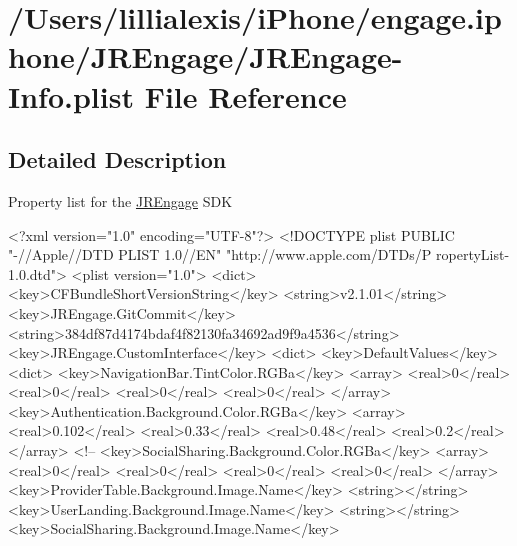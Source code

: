 \hypertarget{_j_r_engage-_info_8plist}{
\section{/Users/lillialexis/iPhone/engage.iphone/JREngage/JREngage-\/Info.plist File Reference}
\label{_j_r_engage-_info_8plist}
}


\subsection{Detailed Description}
Property list for the \hyperlink{interface_j_r_engage}{JREngage} SDK 
\begin{DoxyCodeInclude}
<?xml version="1.0" encoding="UTF-8"?>
<!DOCTYPE plist PUBLIC "-//Apple//DTD PLIST 1.0//EN" "http://www.apple.com/DTDs/P
      ropertyList-1.0.dtd">
<plist version="1.0">
<dict>
        <key>CFBundleShortVersionString</key>
        <string>v2.1.01</string>
        <key>JREngage.GitCommit</key>
        <string>384df87d4174bdaf4f82130fa34692ad9f9a4536</string>
        <key>JREngage.CustomInterface</key>
        <dict>
                <key>DefaultValues</key>
                <dict>
                        <key>NavigationBar.TintColor.RGBa</key>
                        <array>
                                <real>0</real>
                                <real>0</real>
                                <real>0</real>
                                <real>0</real>
                        </array>
                        <key>Authentication.Background.Color.RGBa</key>
                        <array>
                                <real>0.102</real>
                                <real>0.33</real>
                                <real>0.48</real>
                                <real>0.2</real>
                        </array>
<!--
                        <key>SocialSharing.Background.Color.RGBa</key>
                                <array>
                                        <real>0</real>
                                        <real>0</real>
                                        <real>0</real>
                                        <real>0</real>
                                </array>
                        <key>ProviderTable.Background.Image.Name</key>
                        <string></string>
                        <key>UserLanding.Background.Image.Name</key>
                        <string></string>
                        <key>SocialSharing.Background.Image.Name</key>

\end{DoxyCodeInclude}
